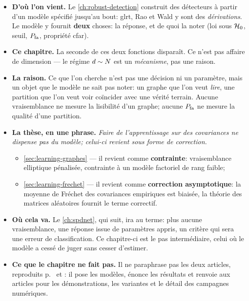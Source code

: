 \begin{itemize}
  \item \textbf{D'où l'on vient.} Le \cref{ch:robust-detection} construit des
    détecteurs à partir d'un modèle spécifié jusqu'au bout: glrt, Rao et Wald
    y sont des \emph{dérivations}. Le modèle y fournit \textbf{deux} choses:
    la réponse, et de quoi la noter (loi sous $\mathcal{H}_0$, seuil, $P_{\mathrm{fa}}$,
    propriété cfar).
  \item \textbf{Ce chapitre.} La seconde de ces deux fonctions disparaît. Ce
    n'est pas affaire de dimension --- le régime $d\sim N$ est un
    \emph{mécanisme}, pas une raison.
  \item \textbf{La raison.} Ce que l'on cherche n'est pas une décision ni un
    paramètre, mais un objet que le modèle ne sait pas noter: un graphe que
    l'on veut \emph{lire}, une partition que l'on veut voir coïncider avec une
    vérité terrain. Aucune vraisemblance ne mesure la lisibilité d'un graphe;
    aucune $P_{\mathrm{fa}}$ ne mesure la qualité d'une partition.
  \item \textbf{La thèse, en une phrase.} \emph{Faire de l'apprentissage sur
    des covariances ne dispense pas du modèle; celui-ci revient sous forme de
    correction.}
  \begin{itemize}
    \item \cref{sec:learning-graphes} --- il revient comme
      \textbf{contrainte}: vraisemblance elliptique pénalisée, contrainte à un
      modèle factoriel de rang faible;
    \item \cref{sec:learning-frechet} --- il revient comme \textbf{correction
      asymptotique}: la moyenne de Fréchet des covariances empiriques est
      biaisée, la théorie des matrices aléatoires fournit le terme correctif.
  \end{itemize}
  \item \textbf{Où cela va.} Le \cref{ch:spdnet}, qui suit, ira au terme: plus
    aucune vraisemblance, une réponse issue de paramètres appris, un critère
    qui sera une erreur de classification. Ce chapitre-ci est le pas
    intermédiaire, celui où le modèle a cessé de juger sans cesser d'estimer.
  \item \textbf{Ce que le chapitre ne fait pas.} Il ne paraphrase pas les deux
    articles, reproduits p.~ et : il pose
    les modèles, énonce les résultats et renvoie aux articles pour les
    démonstrations, les variantes et le détail des campagnes numériques.
\end{itemize}

